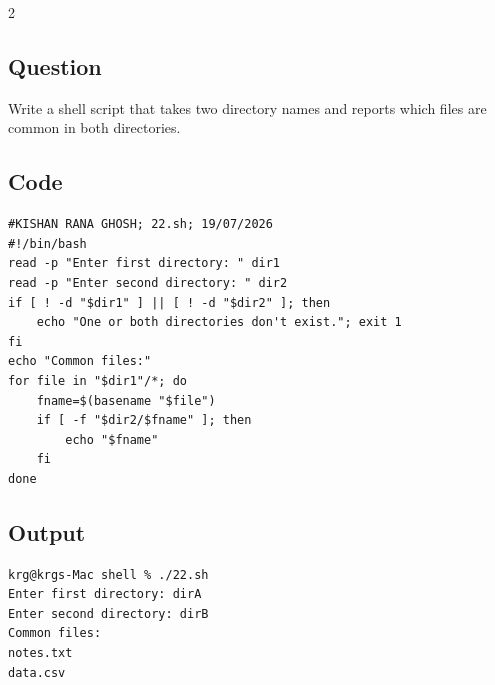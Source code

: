 \documentclass[a4paper,12pt]{article}
\begin{document}
\begin{multicols}{2}
\subsection*{Question}
Write a shell script that takes two directory names and reports which files are common in both directories.

\subsection*{Code}
\begin{lstlisting}[style=bashstyle]
#KISHAN RANA GHOSH; 22.sh; 19/07/2026
#!/bin/bash
read -p "Enter first directory: " dir1
read -p "Enter second directory: " dir2
if [ ! -d "$dir1" ] || [ ! -d "$dir2" ]; then
    echo "One or both directories don't exist."; exit 1
fi
echo "Common files:"
for file in "$dir1"/*; do
    fname=$(basename "$file")
    if [ -f "$dir2/$fname" ]; then
        echo "$fname"
    fi
done
\end{lstlisting}

\subsection*{Output}
\begin{lstlisting}[style=outputstyle]
krg@krgs-Mac shell % ./22.sh
Enter first directory: dirA
Enter second directory: dirB
Common files:
notes.txt
data.csv
\end{lstlisting}

\end{multicols}
\newpage
\end{document}
